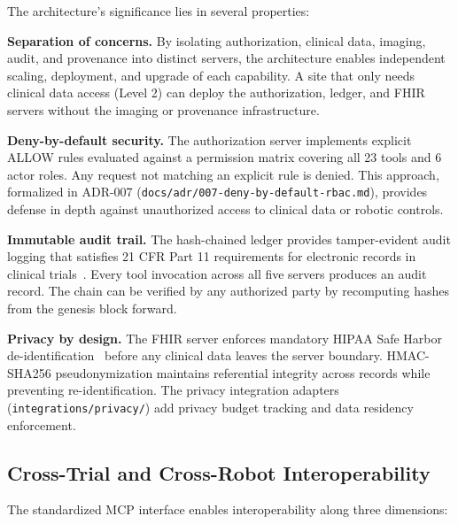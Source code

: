\documentclass{article}
\begin{document}
The architecture's significance lies in several properties:

\textbf{Separation of concerns.} By isolating authorization, clinical data, imaging, audit, and provenance into distinct servers, the architecture enables independent scaling, deployment, and upgrade of each capability. A site that only needs clinical data access (Level 2) can deploy the authorization, ledger, and FHIR servers without the imaging or provenance infrastructure.

\textbf{Deny-by-default security.} The authorization server implements explicit ALLOW rules evaluated against a permission matrix covering all 23 tools and 6 actor roles. Any request not matching an explicit rule is denied. This approach, formalized in ADR-007 (\texttt{docs/adr/007-deny-by-default-rbac.md}), provides defense in depth against unauthorized access to clinical data or robotic controls.

\textbf{Immutable audit trail.} The hash-chained ledger provides tamper-evident audit logging that satisfies 21 CFR Part 11 requirements for electronic records in clinical trials~\cite{fda2003part11}. Every tool invocation across all five servers produces an audit record. The chain can be verified by any authorized party by recomputing hashes from the genesis block forward.

\textbf{Privacy by design.} The FHIR server enforces mandatory HIPAA Safe Harbor de-identification~\cite{hipaa1996} before any clinical data leaves the server boundary. HMAC-SHA256 pseudonymization maintains referential integrity across records while preventing re-identification. The privacy integration adapters (\texttt{integrations/privacy/}) add privacy budget tracking and data residency enforcement.

\subsection{Cross-Trial and Cross-Robot Interoperability}

The standardized MCP interface enables interoperability along three dimensions:
\end{document}
